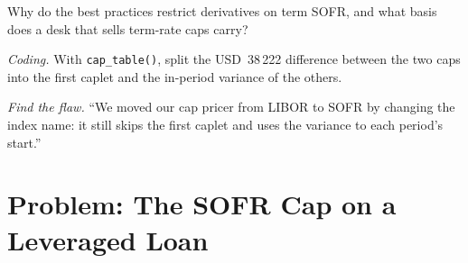 \begin{exercise}[$\star\star$]\label{exo:rc:modelling-overnight-rate-products:6}
Why do the best practices restrict derivatives on term SOFR, and what basis does a
desk that sells term-rate caps carry?
\end{exercise}

\begin{exercise}[$\star\star\star$]\label{exo:rc:modelling-overnight-rate-products:7}
\emph{Coding.} With \texttt{cap\_table()}, split the USD~38\,222 difference between
the two caps into the first caplet and the in-period variance of the others.
\end{exercise}

\begin{exercise}[$\star\star\star$]\label{exo:rc:modelling-overnight-rate-products:8}
\emph{Find the flaw.} ``We moved our cap pricer from LIBOR to SOFR by changing the
index name: it still skips the first caplet and uses the variance to each period's
start.''
\end{exercise}

\section{Problem: The SOFR Cap on a Leveraged Loan}

